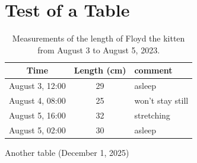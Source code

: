


\chapter{Test of a Table}\label{ch:testtable}


\begin{table}[ht]
    \begin{centering}
    \begin{tabular}{c c l}
    
   
    \bf
    Time&\qquad \bf Length (cm)\qquad & \bf comment\\
    \hline
    \rm
    August 3, 12:00& 29&asleep\\
    August 4, 08:00& 25 &won't stay still\\
    August 5, 16:00& 32 &stretching\\
    August 5, 02:00& 30 &asleep\\
    \end{tabular}
    
    \caption[Kitten length measurements]{Measurements of the length of Floyd the kitten from August 3 to August 5, 2023.}
    \label{tab:kitten}
    \end{centering}
\end{table}

Another table (December 1, 2025)


